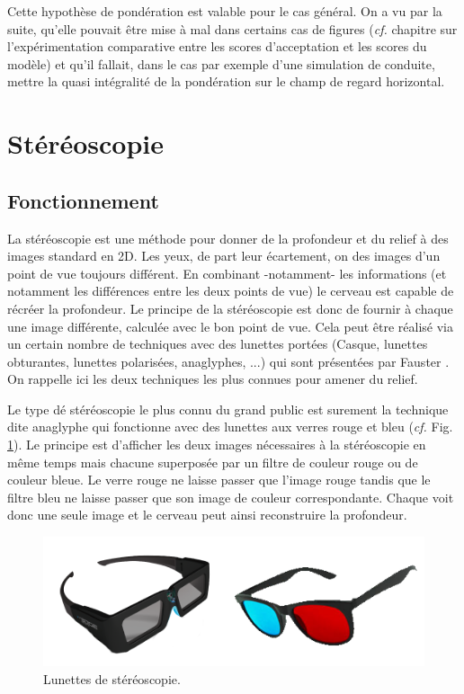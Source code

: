 	\par Cette hypothèse de pondération est valable pour le cas général. On a vu par la suite, qu'elle pouvait être mise à mal dans certains cas de figures (\textit{cf.} chapitre sur l'expérimentation comparative entre les scores d'acceptation et les scores du modèle) et qu'il fallait, dans le cas par exemple d'une simulation de conduite, mettre la quasi intégralité de la pondération sur le champ de regard horizontal.
	
	\section{Stéréoscopie}
	\subsection{Fonctionnement}	
	\par La stéréoscopie est une méthode pour donner de la profondeur et du relief à des images  standard en 2D. Les yeux, de part leur écartement, on des images d'un point de vue toujours différent. En combinant -notamment- les informations (et notamment les différences entre les deux points de vue) le cerveau est capable de récréer la profondeur. Le principe de la stéréoscopie est donc de fournir à chaque une image différente, calculée avec le bon point de vue. Cela peut être réalisé via un certain nombre de techniques avec des lunettes portées (Casque, lunettes obturantes, lunettes polarisées, anaglyphes, ...) qui sont présentées par Fauster \citep{fauster_stereoscopic_2007}. On rappelle ici les deux techniques les plus connues pour amener du relief.
	
	\par Le type dé stéréoscopie le plus connu du grand public est surement la technique dite anaglyphe qui fonctionne avec des lunettes aux verres rouge et bleu (\textit{cf.} Fig. \ref{fig:stereo_glasses}). Le principe est d'afficher les deux images nécessaires à la stéréoscopie en même temps mais chacune superposée par un filtre de couleur rouge ou de couleur bleue. Le verre rouge ne laisse passer que l'image rouge tandis que le filtre bleu ne laisse passer que son image de couleur correspondante. Chaque voit donc une seule image et le cerveau peut ainsi reconstruire la profondeur.
	
	\begin{figure}
		\centering
		\includegraphics[scale=.8]{Figures/StereoActiveAnaglyphGlasses}
		\caption{Lunettes de stéréoscopie.}
		\label{fig:stereo_glasses}
	\end{figure}
	

